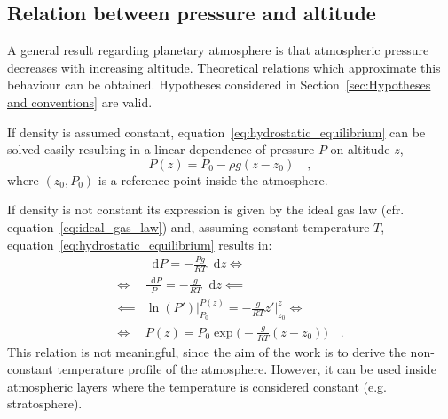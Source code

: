 \documentclass[a4paper,10pt,final,twocolumn]{article}
\newcommand{\dd}{\mathop{}\!\mathrm{d}}
\begin{document}
\subsection{Relation between pressure and altitude}
\label{sec:Relation between pressure and altitude}
A general result regarding planetary atmosphere is that atmospheric pressure decreases with increasing altitude. Theoretical relations which approximate this behaviour can be obtained. Hypotheses considered in Section~\ref{sec:Hypotheses and conventions} are valid.

If density is assumed constant, equation~\eqref{eq:hydrostatic_equilibrium} can be solved easily resulting in a linear dependence of pressure $P$ on altitude $z$, %
\begin{equation}
  \label{eq:pressure_constant_density}
  P(z) = P_0 - \rho g (z - z_0)
  \quad ,
\end{equation}
where $(z_0, P_0)$ is a reference point inside the atmosphere.

If density is not constant its expression is given by the ideal gas law (cfr. equation~\eqref{eq:ideal_gas_law}) and, assuming constant temperature $T$, equation~\eqref{eq:hydrostatic_equilibrium} results in:
\begin{equation}
  \label{eq:pressure_constant_temperature}
  \begin{split}
    & \dd P = - \frac{P g}{R T} \dd z \iff \\
    \iff & \frac{\dd P}{P} = - \frac{g}{R T} \dd z \impliedby \\
    \impliedby & \ln(P') \bigg|_{P_0}^{P(z)} = - \frac{g}{R T} z' \bigg|_{z_0}^{z} \iff \\
    \iff & P(z) = P_0 \exp{\bigg( - \frac{g}{R T} (z - z_0) \bigg)}
    \quad .
  \end{split}
\end{equation}
This relation is not meaningful, since the aim of the work is to derive the non-constant temperature profile of the atmosphere. However, it can be used inside atmospheric layers where the temperature is considered constant (e.g. stratosphere).
\end{document}
